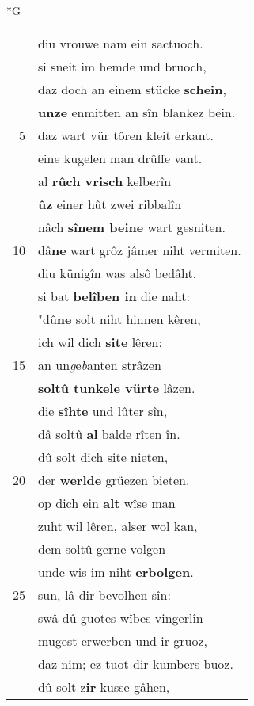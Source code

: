 \documentclass[8pt,a4paper,notitlepage]{article}
\begin{document}
\newpage
\begin{table}[ht]
\begin{minipage}[t]{0.5\linewidth}
\small
\begin{center}*G
\end{center}
\begin{tabular}{rl}
 & diu vrouwe nam ein sactuoch.\\ 
 & si sneit im hemde und bruoch,\\ 
 & daz doch an einem stücke \textbf{schein},\\ 
 & \textbf{unze} enmitten an sîn blankez bein.\\ 
5 & daz wart vür tôren kleit erkant.\\ 
 & eine kugelen man drûffe vant.\\ 
 & al \textbf{rûch vrisch} kelberîn\\ 
 & \textbf{ûz} einer hût zwei ribbalîn\\ 
 & nâch \textbf{sînem beine} wart gesniten.\\ 
10 & dâ\textbf{ne} wart grôz jâmer niht vermiten.\\ 
 & diu künigîn was alsô bedâht,\\ 
 & si bat \textbf{belîben in} die naht:\\ 
 & "dû\textbf{ne} solt niht hinnen kêren,\\ 
 & ich wil dich \textbf{site} lêren:\\ 
15 & an un\textit{g}e\textit{b}anten strâzen\\ 
 & \textbf{soltû tunkele vürte} lâzen.\\ 
 & die \textbf{sîhte} und lûter sîn,\\ 
 & dâ soltû \textbf{al} balde rîten în.\\ 
 & dû solt dich site nieten,\\ 
20 & der \textbf{werlde} grüezen bieten.\\ 
 & op dich ein \textbf{alt} wîse man\\ 
 & zuht wil lêren, alser wol kan,\\ 
 & dem soltû gerne volgen\\ 
 & unde wis im niht \textbf{erbolgen}.\\ 
25 & sun, lâ dir bevolhen sîn:\\ 
 & swâ dû guotes wîbes vingerlîn\\ 
 & mugest erwerben und ir gruoz,\\ 
 & daz nim; ez tuot dir kumbers buoz.\\ 
 & dû solt z\textbf{ir} kusse gâhen,\\ 

\end{tabular}
\end{minipage}
\end{table}
\end{document}
